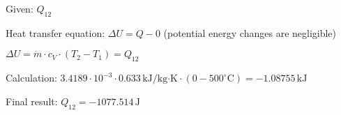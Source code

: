 Given: \( Q_{12} \)  

Heat transfer equation:  
\( \Delta U = Q - 0 \) (potential energy changes are negligible)  

\( \Delta U = \dot{m} \cdot c_V \cdot (T_2 - T_1) = Q_{12} \)  

Calculation:  
\( 3.4189 \cdot 10^{-3} \cdot 0.633 \, \text{kJ/kg·K} \cdot (0 - 500^\circ \text{C}) = -1.08755 \, \text{kJ} \)  

Final result:  
\( Q_{12} = -1077.514 \, \text{J} \)